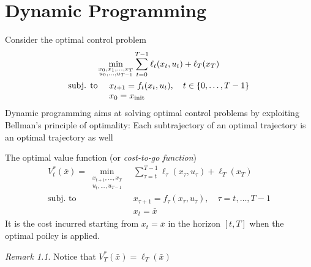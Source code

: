 \documentclass[openany]{book}
\theoremstyle{definition}
\theoremstyle{remark}
\newtheorem*{remark}{Remark}
\begin{document}
\chapter{Dynamic Programming}
Consider the optimal control problem 
\begin{gather*}
    \min_{\substack{x_0,x_1,\dots,x_T\\u_0,\dots,u_{T-1}}} \displaystyle\sum_{t=0}^{T-1}\ell_t(x_t,u_t)+\ell_T(x_T)\\
    \begin{array}{l l }
        \text{subj. to } & x_{t+1}=f_t(x_t,u_t), \quad t\in\{0,\dots,T-1\}\\
                         & x_0 = x_{\text{init}}
    \end{array}
\end{gather*}
Dynamic programming aims at solving optimal control problems by exploiting Bellman's principle of optimality: Each subtrajectory of an optimal trajectory is an optimal trajectory as well

The optimal value function (or \emph{cost-to-go function}) 
\begin{align*}
    V_t^*(\bar{x})=  \min_{\substack{x_{t+1},\dots,x_T\\u_t,\dots,u_{T-1}}} &  \displaystyle\sum_{\tau=t}^{T-1}\ell_\tau(x_\tau,u_\tau)+\ell_T(x_T)\\
                            \text{subj. to } & x_{\tau+1}=f_\tau(x_\tau,u_\tau), \quad \tau = t,\dots,T-1\\
                                             & x_t = \bar{x}
\end{align*}
It is the cost incurred starting from $x_t=\bar{x}$ in the horizon $[t,T]$ when the optimal poilcy is applied.
\begin{remark}
     Notice that $V_T^*(\bar{x})=\ell_T(\bar{x})$
\end{remark}
\end{document}

